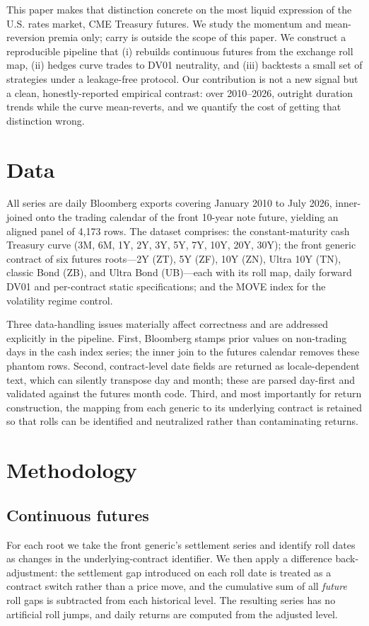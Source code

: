 \documentclass[conference]{IEEEtran}
\begin{document}
This paper makes that distinction concrete on the most liquid expression of the
U.S. rates market, CME Treasury futures. We study the momentum and
mean-reversion premia only; carry is outside the scope of this paper. We construct a reproducible pipeline
that (i) rebuilds continuous futures from the exchange roll map, (ii) hedges
curve trades to DV01 neutrality, and (iii) backtests a small set
of strategies under a leakage-free protocol. Our contribution is not a new
signal but a clean, honestly-reported empirical contrast: over 2010--2026,
outright duration trends while the curve mean-reverts, and we quantify the cost
of getting that distinction wrong.

\section{Data}
All series are daily Bloomberg exports covering January 2010 to July 2026,
inner-joined onto the trading calendar of the front 10-year note future,
yielding an aligned panel of 4{,}173 rows. The dataset comprises: the
constant-maturity cash Treasury curve (3M, 6M, 1Y, 2Y, 3Y, 5Y, 7Y, 10Y, 20Y,
30Y); the front generic contract of six futures roots---2Y (ZT), 5Y (ZF), 10Y
(ZN), Ultra 10Y (TN), classic Bond (ZB), and Ultra Bond (UB)---each with its
roll map, daily forward DV01 and per-contract static specifications; and the
MOVE index for the volatility regime control.

Three data-handling issues materially affect correctness and are addressed
explicitly in the pipeline. First, Bloomberg stamps prior values on
non-trading days in the cash index series; the inner join to the futures
calendar removes these phantom rows. Second, contract-level date fields are
returned as locale-dependent text, which can silently transpose day and month;
these are parsed day-first and validated against the futures month code.
Third, and most importantly for return construction, the mapping from each
generic to its underlying contract is retained so that rolls can be identified
and neutralized rather than contaminating returns.

\section{Methodology}

\subsection{Continuous futures}
For each root we take the front generic's settlement series and identify roll
dates as changes in the underlying-contract identifier. We then apply a
difference back-adjustment: the settlement gap introduced on each roll date is
treated as a contract switch rather than a price move, and the cumulative sum of
all \emph{future} roll gaps is subtracted from each historical level. The
resulting series has no artificial roll jumps, and daily returns are computed
from the adjusted level.
\end{document}
